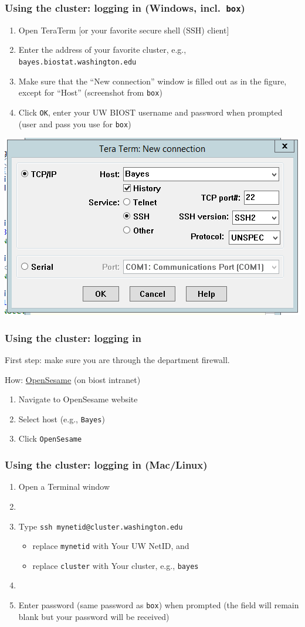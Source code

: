 \documentclass[12pt, 
hyperref={colorlinks=true, linkcolor=BlueViolet, urlcolor=BlueViolet},dvipsnames]{beamer}
\begin{document}
\begin{frame}
\frametitle{Using the cluster: logging in (Windows, incl.~\texttt{box})}
\begin{enumerate}
\item Open TeraTerm [or your favorite secure shell (SSH) client]
\item Enter the address of your favorite cluster, e.g., \texttt{bayes.biostat.washington.edu}
\item Make sure that the ``New connection'' window is filled out as in the figure, except for ``Host'' (screenshot from \texttt{box})
\item Click \texttt{OK}, enter your UW BIOST username and password when prompted (user and pass you use for \texttt{box}) 
\end{enumerate}
\centering
\includegraphics[width = .45\textwidth]{plots/tera_term_example.png}
\end{frame}

\begin{frame}
\frametitle{Using the cluster: logging in}
First step: make sure you are through the department firewall.

How: \href{https://apps.biostat.washington.edu/sesame/}{OpenSesame} (on biost intranet) \vspace{-0.3cm}
\begin{enumerate}
\item Navigate to OpenSesame website
\item Select host (e.g., \texttt{Bayes})
\item Click \texttt{OpenSesame}
\end{enumerate}
\end{frame}

\begin{frame}
\frametitle{Using the cluster: logging in (Mac/Linux)}
\begin{enumerate}
\item Open a Terminal window
\item[]
\item Type \texttt{ssh mynetid@cluster.washington.edu}
\begin{itemize}
\item replace \texttt{mynetid} with Your UW NetID, and 
\item replace \texttt{cluster} with Your cluster, e.g., \texttt{bayes}
\end{itemize} 
\item[]
\item Enter password (same password as \texttt{box}) when prompted (the field will remain blank but your password will be received)
\end{enumerate}

\end{frame}
\end{document}
